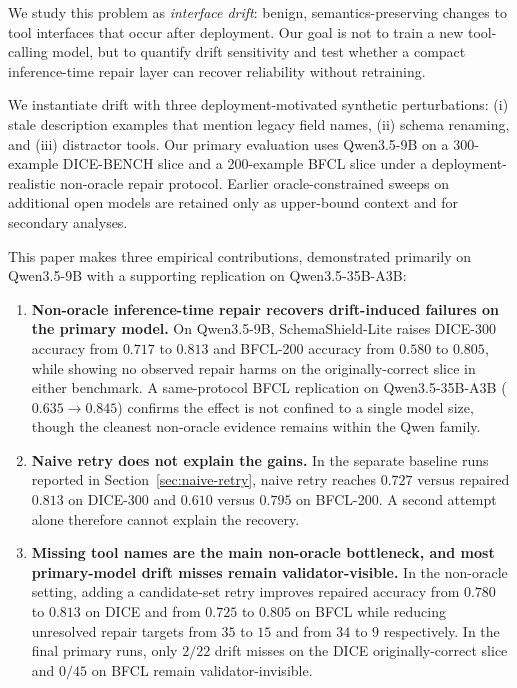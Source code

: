 \documentclass[runningheads]{llncs}
\newcommand{\method}{SchemaShield-Lite\xspace}
\begin{document}
We study this problem as \emph{interface drift}: benign, semantics-preserving
changes to tool interfaces that occur after deployment. Our goal is not to train a
new tool-calling model, but to quantify drift sensitivity and test whether a compact
inference-time repair layer can recover reliability without retraining.

We instantiate drift with three deployment-motivated synthetic perturbations: (i)
stale description examples that mention legacy field names, (ii) schema renaming,
and (iii) distractor tools. Our primary evaluation uses Qwen3.5-9B on a
300-example DICE-BENCH slice \cite{jang2025dicebench} and a 200-example BFCL
slice \cite{bfcl2024} under a deployment-realistic non-oracle repair protocol.
Earlier oracle-constrained sweeps on additional open models are retained only as
upper-bound context and for secondary analyses.

This paper makes three empirical contributions, demonstrated primarily on
Qwen3.5-9B with a supporting replication on Qwen3.5-35B-A3B:

\begin{enumerate}
\item \textbf{Non-oracle inference-time repair recovers drift-induced failures on
the primary model.} On Qwen3.5-9B, \method raises DICE-300 accuracy from $0.717$
to $0.813$ and BFCL-200 accuracy from $0.580$ to $0.805$, while showing no
observed repair harms on the originally-correct slice in either benchmark. A
same-protocol BFCL replication on Qwen3.5-35B-A3B ($0.635 \rightarrow 0.845$)
confirms the effect is not confined to a single model size, though the cleanest
non-oracle evidence remains within the Qwen family.

\item \textbf{Naive retry does not explain the gains.} In the separate baseline
runs reported in Section~\ref{sec:naive-retry}, naive retry reaches $0.727$
versus repaired $0.813$ on DICE-300 and $0.610$ versus $0.795$ on BFCL-200.
A second attempt alone therefore cannot explain the recovery.

\item \textbf{Missing tool names are the main non-oracle bottleneck, and most
primary-model drift misses remain validator-visible.} In the non-oracle setting,
adding a candidate-set retry improves repaired accuracy from $0.780$ to $0.813$ on
DICE and from $0.725$ to $0.805$ on BFCL while reducing unresolved repair targets
from $35$ to $15$ and from $34$ to $9$ respectively. In the final primary runs,
only $2/22$ drift misses on the DICE originally-correct slice and $0/45$ on BFCL
remain validator-invisible.
\end{enumerate}
\end{document}

